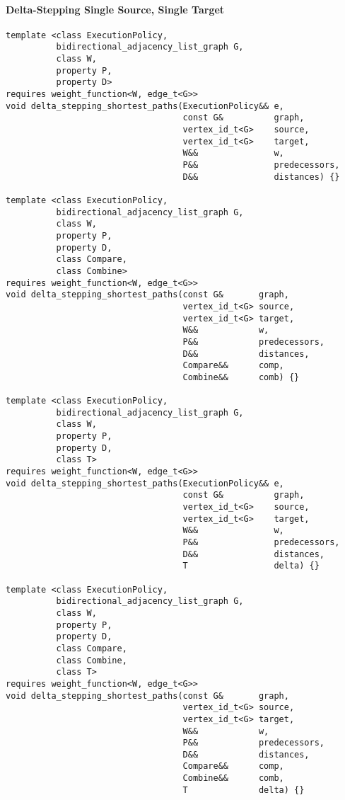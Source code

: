 \paragraph{Delta-Stepping Single Source, Single Target}
\begin{lstlisting}
template <class ExecutionPolicy,
          bidirectional_adjacency_list_graph G,
          class W,
          property P,
          property D>
requires weight_function<W, edge_t<G>>
void delta_stepping_shortest_paths(ExecutionPolicy&& e,
                                   const G&          graph,
                                   vertex_id_t<G>    source,
                                   vertex_id_t<G>    target,
                                   W&&               w,
                                   P&&               predecessors,
                                   D&&               distances) {}

template <class ExecutionPolicy,
          bidirectional_adjacency_list_graph G,
          class W,
          property P,
          property D,
          class Compare,
          class Combine>
requires weight_function<W, edge_t<G>>
void delta_stepping_shortest_paths(const G&       graph,
                                   vertex_id_t<G> source,
                                   vertex_id_t<G> target,
                                   W&&            w,
                                   P&&            predecessors,
                                   D&&            distances,
                                   Compare&&      comp,
                                   Combine&&      comb) {}

template <class ExecutionPolicy,
          bidirectional_adjacency_list_graph G,
          class W,
          property P,
          property D,
          class T>
requires weight_function<W, edge_t<G>>
void delta_stepping_shortest_paths(ExecutionPolicy&& e,
                                   const G&          graph,
                                   vertex_id_t<G>    source,
                                   vertex_id_t<G>    target,
                                   W&&               w,
                                   P&&               predecessors,
                                   D&&               distances,
                                   T                 delta) {}

template <class ExecutionPolicy,
          bidirectional_adjacency_list_graph G,
          class W,
          property P,
          property D,
          class Compare,
          class Combine,
          class T>
requires weight_function<W, edge_t<G>>
void delta_stepping_shortest_paths(const G&       graph,
                                   vertex_id_t<G> source,
                                   vertex_id_t<G> target,
                                   W&&            w,
                                   P&&            predecessors,
                                   D&&            distances,
                                   Compare&&      comp,
                                   Combine&&      comb,
                                   T              delta) {}

\end{lstlisting}


